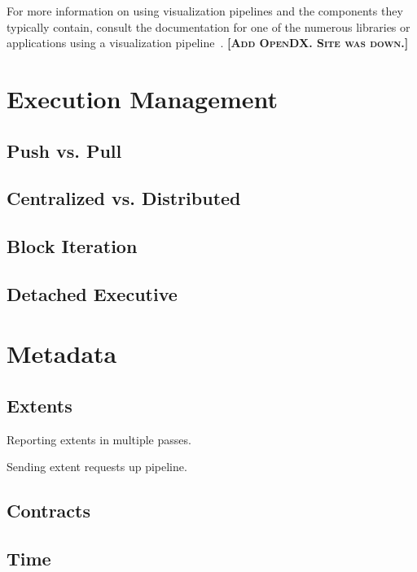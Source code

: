 \documentclass{article}
\newcommand*{\lcite}[1]{~\cite{#1}}
\newcommand{\fix}[1]{{\color{red}\textbf{\textsc{[#1]}}}}
\begin{document}
For more information on using visualization pipelines and the components
they typically contain, consult the documentation for one of the numerous
libraries or applications using a visualization
pipeline\lcite{VTK,ParaView,ParaViewTutorial,SCIRunUserGuide,IRISExplorerUsersGuide}.
\fix{Add OpenDX.  Site was down.}


\section{Execution Management}
\label{sec:ExecutionManagement}

\subsection{Push vs. Pull}
\label{sec:PushPull}

\subsection{Centralized vs. Distributed}
\label{sec:CentralizedDistributed}

\subsection{Block Iteration}
\label{sec:BlockIteration}

\subsection{Detached Executive}
\label{sec:DetachedExecutive}


\section{Metadata}
\label{sec:Metadata}

\subsection{Extents}
\label{sec:Extents}

Reporting extents in multiple passes.

Sending extent requests up pipeline.

\subsection{Contracts}
\label{sec:Contracts}

\subsection{Time}
\label{sec:Time}
\end{document}

